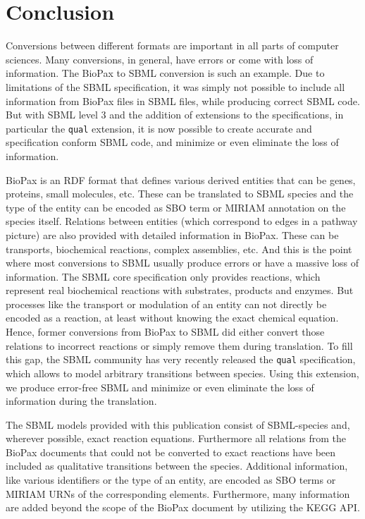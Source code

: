 \documentclass{bioinfo}
\begin{document}
\section{Conclusion}

Conversions between different formats are important in all parts of computer sciences. Many conversions, in general, have errors or come with loss of information. The BioPax to SBML conversion is such an example. Due to limitations of the SBML specification, it was simply not possible to include all information from BioPax files in SBML files, while producing correct SBML code. But with SBML level 3 and the addition of extensions to the specifications, in particular the \texttt{qual} extension, it is now possible to create accurate and specification conform SBML code, and minimize or even eliminate the loss of information.

BioPax is an RDF format that defines various derived entities that can be genes, proteins, small molecules, etc. These can be translated to SBML species and the type of the entity can be encoded as SBO term or MIRIAM annotation on the species itself. Relations between entities (which correspond to edges in a pathway picture) are also provided with detailed information in BioPax. These can be transports, biochemical reactions, complex assemblies, etc. And this is the point where most conversions to SBML usually produce errors or have a massive loss of information. The SBML core specification only provides reactions, which represent real biochemical reactions with substrates, products and enzymes. But processes like the transport or modulation of an entity can not directly be encoded as a reaction, at least without knowing the exact chemical equation. Hence, former conversions from BioPax to SBML did either convert those relations to incorrect reactions or simply remove them during translation. To fill this gap, the SBML community has very recently released the \texttt{qual} specification, which allows to model arbitrary transitions between species. Using this extension, we produce error-free SBML and minimize or even eliminate the loss of information during the translation.

The SBML models provided with this publication consist of SBML-species and, wherever possible, exact reaction equations. Furthermore all relations from the BioPax documents that could not be converted to exact reactions have been included as qualitative transitions between the species. Additional information, like various identifiers or the type of an entity, are encoded as SBO terms or MIRIAM URNs of the corresponding elements. Furthermore, many information are added beyond the scope of the BioPax document by utilizing the KEGG API.
\end{document}
